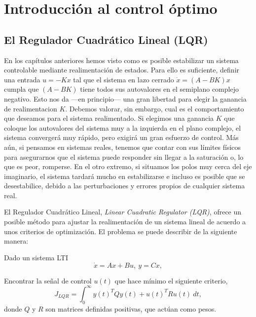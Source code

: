 \chapter{Introducción al control óptimo}
\section{El Regulador Cuadrático Lineal (LQR)}
En los capítulos anteriores hemos visto como es posible estabilizar un sistema controlable mediante realimentación de estados. Para ello es suficiente, definir una entrada $u = -Kx$ tal que el sistema en lazo cerrado $\dot x = (A-BK)x$ cumpla que $(A-BK)$ tiene todos sus autovalores en el semiplano complejo negativo. Esto nos da ---en principio--- una gran libertad para elegir la ganancia de realimentacion $K$. Debemos valorar, sin embargo, cual es el comportamiento que deseamos para el sistema realimentado. Si elegimos una ganancia $K$ que coloque los autovalores del sistema muy a la izquierda en el plano complejo, el sistema convergerá muy rápido, pero exigirá un gran esfuerzo de control. Más aún, si pensamos en sistemas reales, tenemos que contar con sus límites físicos para asegurarnos que el sistema puede responder sin llegar a la saturación o, lo que es peor, romperse. En el otro extremo, si situamos los polos muy cerca del eje imaginario, el sistema tardará mucho en estabilizarse e incluso es posible que se desestabilice, debido a las perturbaciones y errores propios de cualquier sistema real.

El Regulador Cuadrático Lineal, \emph{Linear Cuadratic Regulator (LQR)}, ofrece un posible método para ajustar la realimentación de un sistema lineal de acuerdo a unos criterios de optimización. El problema se puede describir de la siguiente manera:

Dado un sistema LTI
\begin{equation*}
\dot{x} = Ax+Bu,\ y=Cx,
\end{equation*}

Encontrar la señal de control $u(t)$ que hace mínimo el siguiente criterio,
\begin{equation}\label{eq:lqr}
J_{LQR} = \int_0^{\infty}y(t)^TQy(t)+u(t)^TRu(t)\ dt,
\end{equation}
donde $Q$ y $R$ son matrices definidas positivas, que actúan como pesos.

